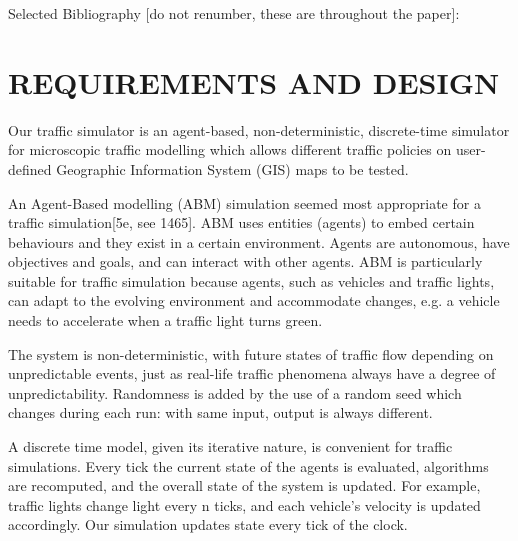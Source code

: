 \documentclass[11pt]{article}
\begin{document}
Selected Bibliography [do not renumber, these are throughout the paper]:


\section{REQUIREMENTS AND DESIGN}


Our traffic simulator is an agent-based, non-deterministic, discrete-time simulator for microscopic traffic modelling which allows different traffic policies on user-defined Geographic Information System (GIS) maps to be tested. 

An Agent-Based modelling (ABM) simulation seemed most appropriate for a traffic simulation[5e, see 1465]. ABM uses entities (agents) to embed certain behaviours and they exist in a certain environment. Agents are autonomous, have objectives and goals, and can interact with other agents. ABM is particularly suitable for traffic simulation because agents, such as vehicles and traffic lights, can adapt to the evolving environment and accommodate changes, e.g. a vehicle needs to accelerate when a traffic light turns green.

The system is non-deterministic, with future states of traffic flow depending on unpredictable events, just as real-life traffic phenomena always have a degree of unpredictability. Randomness is added by the use of a random seed which changes during each run: with same input, output is always different. 

A discrete time model, given its iterative nature, is convenient for traffic simulations. Every tick the current state of the agents is evaluated, algorithms are recomputed, and the overall state of the system is updated. For example, traffic lights change light every n ticks, and each vehicle\textquoteright s velocity is updated accordingly. Our simulation updates state every tick of the clock.
\end{document}
